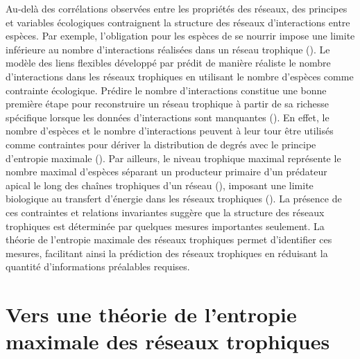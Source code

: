 Au-delà des corrélations observées entre les propriétés des réseaux, des
principes et variables écologiques contraignent la structure des réseaux
d'interactions entre espèces. Par exemple, l'obligation pour les espèces de se
nourrir impose une limite inférieure au nombre d'interactions réalisées dans un
réseau trophique (\cite{MacDonald2020Revisiting}). Le modèle des liens flexibles
développé par \textcite{MacDonald2020Revisiting} prédit de manière réaliste le
nombre d'interactions dans les réseaux trophiques en utilisant le nombre
d'espèces comme contrainte écologique. Prédire le nombre d'interactions
constitue une bonne première étape pour reconstruire un réseau trophique à
partir de sa richesse spécifique lorsque les données d'interactions sont
manquantes (\cite{Strydom2021Roadmapa}). En effet, le nombre d'espèces et le
nombre d'interactions peuvent à leur tour être utilisés comme contraintes pour
dériver la distribution de degrés avec le principe d'entropie maximale
(\cite{Williams2011Biology}). Par ailleurs, le niveau trophique maximal
représente le nombre maximal d'espèces séparant un producteur primaire d'un
prédateur apical le long des chaînes trophiques d'un réseau
(\cite{Cohen1978Food}), imposant une limite biologique au transfert d'énergie
dans les réseaux trophiques (\cite{Williams2004Limits}). La présence de ces
contraintes et relations invariantes suggère que la structure des réseaux
trophiques est déterminée par quelques mesures importantes seulement. La théorie
de l'entropie maximale des réseaux trophiques permet d'identifier ces mesures,
facilitant ainsi la prédiction des réseaux trophiques en réduisant la quantité
d'informations préalables requises. 


\section{Vers une théorie de l'entropie maximale des réseaux trophiques}

